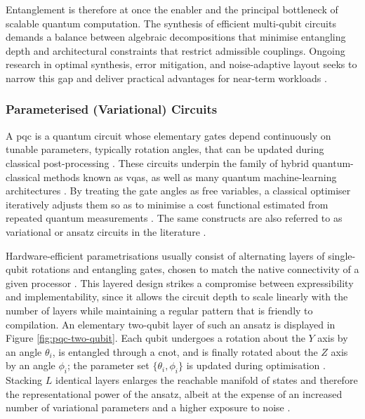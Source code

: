 Entanglement is therefore at once the enabler and the principal bottleneck of scalable quantum computation. The synthesis of efficient multi-qubit circuits demands a balance between algebraic decompositions that minimise entangling depth and architectural constraints that restrict admissible couplings. Ongoing research in optimal synthesis, error mitigation, and noise-adaptive layout seeks to narrow this gap and deliver practical advantages for near-term workloads \cite{NielsenChuang2010}.

\subsubsection*{Parameterised (Variational) Circuits}

A \gls{pqc} is a quantum circuit whose elementary gates depend continuously on tunable parameters, typically rotation angles, that can be updated during classical post-processing \cite{Peruzzo2014vqe}. These circuits underpin the family of hybrid quantum-classical methods known as \glspl{vqa}, as well as many quantum machine-learning architectures \cite{Cerezo2021variational}. By treating the gate angles as free variables, a classical optimiser iteratively adjusts them so as to minimise a cost functional estimated from repeated quantum measurements \cite{Peruzzo2014vqe}. The same constructs are also referred to as variational or ansatz circuits in the literature \cite{Kandala2017hardware}.

Hardware-efficient parametrisations usually consist of alternating layers of single-qubit rotations and entangling gates, chosen to match the native connectivity of a given processor \cite{Kandala2017hardware}. This layered design strikes a compromise between expressibility and implementability, since it allows the circuit depth to scale linearly with the number of layers while maintaining a regular pattern that is friendly to compilation. An elementary two-qubit layer of such an ansatz is displayed in Figure \ref{fig:pqc-two-qubit}. Each qubit undergoes a rotation about the $Y$ axis by an angle $\theta_{i}$, is entangled through a \gls{cnot}, and is finally rotated about the $Z$ axis by an angle $\phi_{i}$; the parameter set $\{\theta_{i},\phi_{i}\}$ is updated during optimisation \cite{Peruzzo2014vqe}. Stacking $L$ identical layers enlarges the reachable manifold of states and therefore the representational power of the ansatz, albeit at the expense of an increased number of variational parameters and a higher exposure to noise \cite{Sim2019expressibility}.

